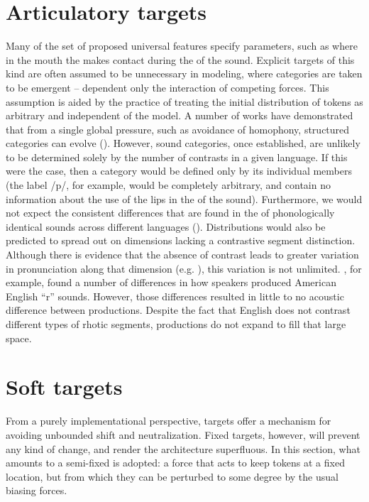\section{Articulatory targets}

Many of the set of proposed universal  features specify
 parameters, such as where in the mouth the 
makes contact during the  of the sound. Explicit targets
of this kind are often assumed to be unnecessary in  modeling,
where categories are taken to be emergent – dependent only the interaction
of competing forces. This assumption is aided by the practice of treating
the initial distribution of tokens as arbitrary and independent of
the model. A number of works have demonstrated that from a single
global pressure, such as avoidance of homophony, structured categories
can evolve (\citealt{Boer2000,Wedel2006,soskuthy2013phonetic}). However,
sound categories, once established, are unlikely to be determined
solely by the number of contrasts in a given language. If this were
the case, then a category would be defined only by its individual
members (the label {/p/}, for example, would be completely
arbitrary, and contain no information about the use of the lips in
the  of the sound). Furthermore, we would not expect the
consistent  differences that are found in the  of
phonologically identical sounds across different languages (\citealt{Keating1985}).
Distributions would also be predicted to spread out on dimensions
lacking a contrastive segment distinction. Although there is evidence
that the absence of contrast leads to greater variation in pronunciation
along that dimension (e.g. \citealt{choi1995acoustic}), this variation
is not unlimited. \citet{Baker2011}, for example, found a number
of differences in how speakers produced American English “r”
sounds. However, those differences resulted in little to no acoustic
difference between productions. Despite the fact that English does
not contrast different types of rhotic segments, productions do not
expand to fill that large  space. 

\section{\label{subsec:Soft-Targets}Soft targets}

From a purely implementational perspective,  targets offer
a mechanism for avoiding unbounded shift and neutralization. Fixed
targets, however, will prevent any kind of change, and render the
 architecture superfluous. In this section, what amounts to
a semi-fixed  is adopted: a force that acts to keep tokens at
a fixed location, but from which they can be perturbed to some degree
by the usual biasing forces. 

